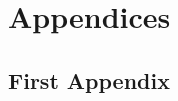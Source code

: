 \documentclass[12pt,twoside]{article}
\begin{document}

    \renewcommand{\thesubsection}{\Alph{subsection}}
        		
    \section*{Appendices}

    \subsection{First Appendix}

    
\end{document}
